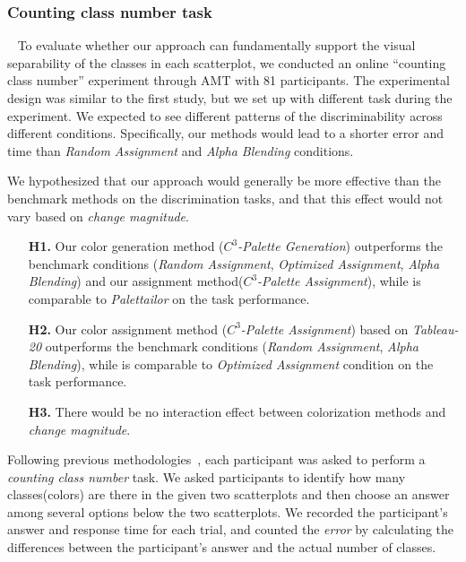 \subsubsection{Counting class number task}
\
\newline
To evaluate whether our approach can fundamentally support the visual separability of the classes in each scatterplot, we conducted an online ``counting class number'' experiment through AMT with 81 participants. The experimental design was similar to the first study, but we set up with different task during the experiment.
We expected to see different patterns of the discriminability across different conditions. Specifically, our methods would lead to a shorter error and time than \emph{Random Assignment} and \emph{Alpha Blending} conditions.

\vspace{.3em}
 We hypothesized that our approach would generally be more effective than the benchmark methods on the discrimination tasks, and that this effect would not vary based on \emph{change magnitude}.
\begin{itemize}[noitemsep]
\setlength{\itemsep}{5pt}
    \item[\textbf{H1.}] Our color generation method (\emph{$C^3$-Palette Generation}) outperforms the benchmark conditions (\emph{Random Assignment}, \emph{Optimized Assignment}, \emph{Alpha Blending}) and our assignment method(\emph{$C^3$-Palette Assignment}), while is comparable to  \emph{Palettailor} on the task performance.

    \item [\textbf{H2.}] Our color assignment method (\emph{$C^3$-Palette Assignment}) based on \emph{Tableau-20} outperforms the benchmark conditions (\emph{Random Assignment}, \emph{Alpha Blending}), while is comparable to \emph{Optimized Assignment} condition on the task performance.

    \item [\textbf{H3.}] There would be no interaction effect between colorization methods and \emph{change magnitude}.
\end{itemize}

\vspace{.3em}
Following previous methodologies~\cite{Wang2018, Lu21}, each participant was asked to perform a \emph{counting class number} task.  We asked participants to identify how many classes(colors) are there in the given two scatterplots and then choose an answer among several options below the two scatterplots. We recorded the participant's answer and response time for each trial, and counted the \emph{error}  by calculating the differences between the participant's answer and the actual number of classes.


